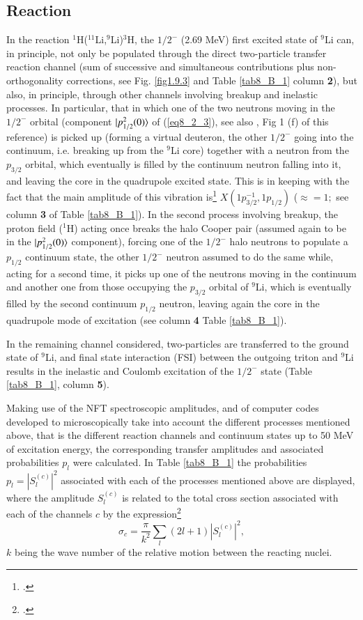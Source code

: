  \subsection{Reaction}\label{C8AppB}
 In the reaction $^1$H($^{11}$Li,$^9$Li)$^3$H,
 the $1/2^-$ (2.69 MeV) first excited state of $^9$Li can, in principle, not only be populated through the direct two-particle transfer reaction channel (sum of successive and simultaneous contributions plus non-orthogonality corrections, see Fig. \ref{fig1.9.3} and Table \ref{tab8_B_1} column \textbf{2}), but also, in principle, through other channels involving breakup and inelastic processes. In particular, that in which one of the two neutrons moving in the $1/2^-$ orbital (component $|{p_{1/2}^2(0)} \rangle$ of (\ref{eq8_2_3}), see also \cite{Potel:10}, Fig 1 (f) of this reference) is picked up (forming a virtual deuteron, the other $1/2^-$ going into the continuum, i.e. breaking up from the $^9$Li core) together with a neutron from the $p_{3/2}$ orbital, which eventually is filled by the continuum neutron falling into it, and leaving the core in the quadrupole excited state. This is in keeping with the fact that the main amplitude of this vibration is\footnote{\cite{Barranco:01}.}  $X(1p^{-1}_{3/2},1p_{1/2})$ ($\approx=1;$ see column \textbf{3} of Table \ref{tab8_B_1}). In the second process involving breakup, the proton field ($^1$H) acting once breaks the halo Cooper pair (assumed again to be in the $|{p_{1/2}^2(0)} \rangle$ component), forcing one of the $1/2^-$ halo neutrons to populate a $p_{1/2}$ continuum state, the other $1/2^-$ neutron assumed to do the same while, acting for a second time, it picks up one of the neutrons moving in the continuum and another one from those occupying the $p_{3/2}$ orbital of $^{9}$Li, which is eventually filled by the second continuum $p_{1/2}$ neutron, leaving again the core in the quadrupole mode of excitation (see column \textbf{4} Table \ref{tab8_B_1}). 
 
  In the remaining channel considered,  two-particles are transferred to the ground state of $^{9}$Li, and final state interaction (FSI) between the outgoing triton and $^{9}$Li results in the inelastic and Coulomb excitation of  the $1/2^-$ state (Table \ref{tab8_B_1}, column \textbf{5}).
 
 
 Making use of the NFT spectroscopic amplitudes, and of computer codes developed  to microscopically take into account   the different processes mentioned above, that is the different reaction channels and continuum states up to 50 MeV of excitation energy, the corresponding transfer amplitudes and associated probabilities $p_l$ were calculated.
 In Table \ref{tab8_B_1}  the probabilities $p_l=|S_l^{(c)}|^2$ associated with each of the processes mentioned above are displayed, where the amplitude $S_l^{(c)}$ is related to the total cross section associated with each of the channels $c$  by the expression\footnote{\cite{Satchler:80,Landau:81}.}
 \begin{equation}\label{eq6B1}
 \sigma_c=\frac{\pi}{k^2}\sum_l(2l+1)|S_l^{(c)}|^2,
 \end{equation}
 $k$ being the wave number of the relative motion between the reacting nuclei.
 
